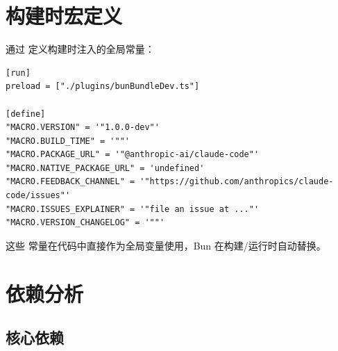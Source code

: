 \section{构建时宏定义}

通过  定义构建时注入的全局常量：

\begin{lstlisting}[breaklines=true]
[run]
preload = ["./plugins/bunBundleDev.ts"]

[define]
"MACRO.VERSION" = '"1.0.0-dev"'
"MACRO.BUILD_TIME" = '""'
"MACRO.PACKAGE_URL" = '"@anthropic-ai/claude-code"'
"MACRO.NATIVE_PACKAGE_URL" = 'undefined'
"MACRO.FEEDBACK_CHANNEL" = '"https://github.com/anthropics/claude-code/issues"'
"MACRO.ISSUES_EXPLAINER" = '"file an issue at ..."'
"MACRO.VERSION_CHANGELOG" = '""'
\end{lstlisting}

这些  常量在代码中直接作为全局变量使用，Bun 在构建/运行时自动替换。

\section{依赖分析}

\subsection{核心依赖}

